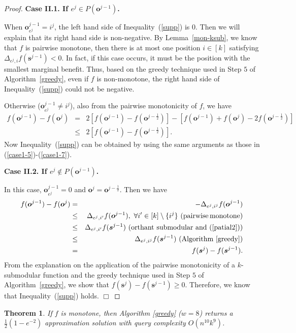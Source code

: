 \documentclass[preprint,12pt]{elsarticle}
\newtheorem{theorem}{Theorem}
\def\bea{\begin{eqnarray}}
\def\eea{\end{eqnarray}}
\def\nn{\nonumber}
\def\endzm{\hfill $\Box$ \bigskip}
\def\bo{\boldsymbol{o}}
\def\bs{\boldsymbol{s}}
\begin{document}
\begin{proof}
\textbf{Case II.1. If $e^j\in P(\bo^{j-1})$.}

When $\bo^{j-1}_{e^j}=i^j$, the left hand side of Inequality~(\ref{supp}) is $0$. Then we will explain that its right hand side is non-negative. By Lemma~\ref{mon-ksub}, we know that $f$ is pairwise monotone,
then there is at most one position $i\in [k]$ satisfying $\Delta_{e^j,i}f(\bs^{j-1})<0$. In fact, if this case occurs, it must be the position with the smallest marginal benefit.
Thus, based on the greedy technique used in Step $5$ of Algorithm~\ref{greedy}, even if $f$ is non-monotone, the right hand side of Inequality~(\ref{supp}) could not be negative.

Otherwise ($\bo^{j-1}_{e^j}\neq i^j$), also from the pairwise monotonicity of $f$,
we have
\bea
f(\bo^{j-1})-f(\bo^j)& = & 2[f(\bo^{j-1})-f(\bo^{j-\frac{1}{2}})]-[f(\bo^{j-1})+f(\bo^j)-2f(\bo^{j-\frac{1}{2}})]\nn\\
& \le & 2[f(\bo^{j-1})-f(\bo^{j-\frac{1}{2}})].\nn
\eea
Now Inequality~(\ref{supp}) can be obtained by using the same arguments as those in (\ref{case1-5})-(\ref{case1-7}).

\textbf{Case II.2. If $e^j\notin P(\bo^{j-1})$.}

In this case, $\bo^{j-1}_{e^j}=0$ and $\bo^{j}=\bo^{j-\frac{1}{2}}$. Then we have
\bea
f(\bo^{j-1})-f(\bo^j) &=&-\Delta_{e^j,i^j} f(\bo^{j-1})\nn\\
&\leq& \Delta_{e^j,i'} f(\bo^{j-1}),\,\,\forall i'\in[k]\setminus\{i^j\} \,\,{\rm (pairwise\, monotone)}\nn \\
&\leq& \Delta_{e^j,i'} f(\bs^{j-1})\,\,({\rm orthant\,\, submodular\,\, and}\,\,(\ref{patial2}))\nn\\
& \leq & \Delta_{e^j,i^j} f(\bs^{j-1})\,\,({\rm Algorithm}~\ref{greedy})\nn\\
& = & f(\bs^j)-f(\bs^{j-1}).\nn
\eea
From the explanation on the application of the pairwise monotonicity of a $k$-submodular function and the greedy technique used in Step $5$ of  Algorithm~\ref{greedy}, we show that $f(\bs^j)-f(\bs^{j-1})\geq 0$. Therefore, we know that Inequality~(\ref{supp}) holds.
\endzm
\end{proof}


\begin{theorem}\label{the1}
If $f$ is monotone, then Algorithm \ref{greedy} ($w=8$) returns a $\frac{1}{2}(1-e^{-2})$ approximation solution with query complexity $O(n^{10}k^9)$.
\end{theorem}
\end{document}
